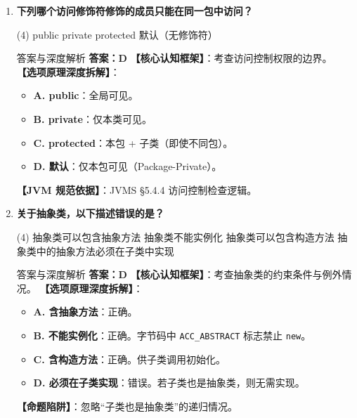 ﻿\documentclass[12pt, a4paper]{ctexart}
\newcommand{\code}[1]{\texttt{#1}}
\begin{document}
\begin{enumerate}[label=\textbf{\arabic*.}, itemsep=1em]
	\item \textbf{下列哪个访问修饰符修饰的成员只能在同一包中访问？}
	      \begin{tasks}(4)
		      \task public \task private \task protected \task 默认（无修饰符）
	      \end{tasks}
	      \begin{bluebox}{答案与深度解析}
		      \textbf{答案：D}
		      \textbf{【核心认知框架】}：考查访问控制权限的边界。
		      \textbf{【选项原理深度拆解】}：
		      \begin{itemize}[leftmargin=*, nosep]
			      \item \textbf{A. public}：全局可见。
			      \item \textbf{B. private}：仅本类可见。
			      \item \textbf{C. protected}：本包 + 子类（即使不同包）。
			      \item \textbf{D. 默认}：仅本包可见（Package-Private）。
		      \end{itemize}
		      \textbf{【JVM 规范依据】}：JVMS §5.4.4 访问控制检查逻辑。
	      \end{bluebox}

	\item \textbf{关于抽象类，以下描述错误的是？}
	      \begin{tasks}(4)
		      \task 抽象类可以包含抽象方法 \task 抽象类不能实例化
		      \task 抽象类可以包含构造方法 \task 抽象类中的抽象方法必须在子类中实现
	      \end{tasks}
	      \begin{bluebox}{答案与深度解析}
		      \textbf{答案：D}
		      \textbf{【核心认知框架】}：考查抽象类的约束条件与例外情况。
		      \textbf{【选项原理深度拆解】}：
		      \begin{itemize}[leftmargin=*, nosep]
			      \item \textbf{A. 含抽象方法}：正确。
			      \item \textbf{B. 不能实例化}：正确。字节码中 \code{ACC\_ABSTRACT} 标志禁止 \code{new}。
			      \item \textbf{C. 含构造方法}：正确。供子类调用初始化。
			      \item \textbf{D. 必须在子类实现}：错误。若子类也是抽象类，则无需实现。
		      \end{itemize}
		      \textbf{【命题陷阱】}：忽略“子类也是抽象类”的递归情况。
	      \end{bluebox}


\end{enumerate}
\end{document}
